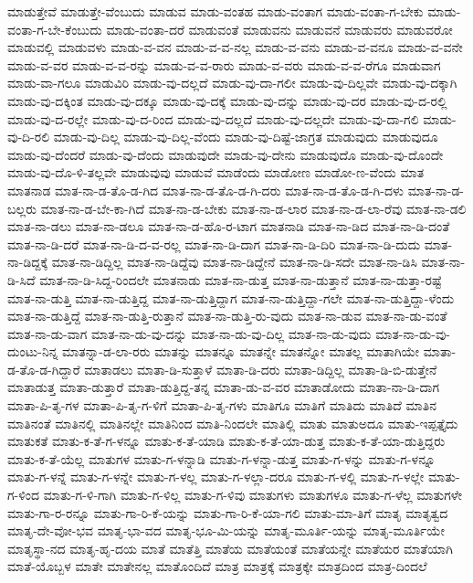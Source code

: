 {ಮಾಡುತ್ತೇವೆ
ಮಾಡುತ್ತೇ-ವೆಂಬುದು
ಮಾಡುವ
ಮಾಡು-ವಂತಹ
ಮಾಡು-ವಂತಾಗ
ಮಾಡು-ವಂತಾ-ಗ-ಬೇಕು
ಮಾಡು-ವಂತಾ-ಗ-ಬೇ-ಕೆಂಬುದು
ಮಾಡು-ವಂತಾ-ದರೆ
ಮಾಡುವಂತೆ
ಮಾಡುವನು
ಮಾಡುವನೆ
ಮಾಡುವರು
ಮಾಡುವರೋ
ಮಾಡುವಲ್ಲಿ
ಮಾಡುವಳು
ಮಾಡು-ವ-ವನ
ಮಾಡು-ವ-ವ-ನಲ್ಲ
ಮಾಡು-ವ-ವನು
ಮಾಡು-ವ-ವನೂ
ಮಾಡು-ವ-ವನೇ
ಮಾಡು-ವ-ವರ
ಮಾಡು-ವ-ವ-ರನ್ನು
ಮಾಡು-ವ-ವ-ರಾರು
ಮಾಡು-ವ-ವರು
ಮಾಡು-ವ-ವ-ರೆಗೂ
ಮಾಡುವಾಗ
ಮಾಡು-ವಾ-ಗಲೂ
ಮಾಡುವಿರಿ
ಮಾಡು-ವು-ದಲ್ಲದೆ
ಮಾಡು-ವು-ದಾ-ಗಲೀ
ಮಾಡು-ವು-ದಿಲ್ಲವೇ
ಮಾಡು-ವು-ದಕ್ಕಾಗಿ
ಮಾಡು-ವು-ದಕ್ಕಿಂತ
ಮಾಡು-ವು-ದಕ್ಕೂ
ಮಾಡು-ವು-ದಕ್ಕೆ
ಮಾಡು-ವು-ದನ್ನು
ಮಾಡು-ವು-ದರ
ಮಾಡು-ವು-ದ-ರಲ್ಲಿ
ಮಾಡು-ವು-ದ-ರಲ್ಲೇ
ಮಾಡು-ವು-ದ-ರಿಂದ
ಮಾಡು-ವು-ದಲ್ಲದೆ
ಮಾಡು-ವು-ದಲ್ಲದೇ
ಮಾಡು-ವು-ದಾ-ಗಲಿ
ಮಾಡು-ವು-ದಿ-ರಲಿ
ಮಾಡು-ವು-ದಿಲ್ಲ
ಮಾಡು-ವು-ದಿಲ್ಲ-ವೆಂದು
ಮಾಡು-ವು-ದಿಷ್ಟೆ-ಜಾಗ್ರತ
ಮಾಡುವುದು
ಮಾಡುವುದೂ
ಮಾಡು-ವು-ದೆಂದರೆ
ಮಾಡು-ವು-ದೆಂದು
ಮಾಡುವುದೇ
ಮಾಡು-ವು-ದೇನು
ಮಾಡುವುದೊ
ಮಾಡು-ವು-ದೊಂದೇ
ಮಾಡು-ವು-ದೊ-ಳಿ-ತಲ್ಲವೇ
ಮಾಡುವುವು
ಮಾಡುವೆ
ಮಾಡೆಂದು
ಮಾಡೋಣ
ಮಾಡೋ-ಣ-ವೆಂದು
ಮಾತ
ಮಾತನಾಡ
ಮಾತ-ನಾ-ಡ-ತೊ-ಡ-ಗಿದ
ಮಾತ-ನಾ-ಡ-ತೊ-ಡ-ಗಿ-ದರು
ಮಾತ-ನಾ-ಡ-ತೊ-ಡ-ಗಿ-ದಳು
ಮಾತ-ನಾ-ಡ-ಬಲ್ಲರು
ಮಾತ-ನಾ-ಡ-ಬೇ-ಕಾ-ಗಿದೆ
ಮಾತ-ನಾ-ಡ-ಬೇಕು
ಮಾತ-ನಾ-ಡ-ಲಾರ
ಮಾತ-ನಾ-ಡ-ಲಾ-ರೆವು
ಮಾತ-ನಾ-ಡಲಿ
ಮಾತ-ನಾ-ಡಲು
ಮಾತ-ನಾ-ಡಲೂ
ಮಾತ-ನಾ-ಡ-ಹೊ-ರ-ಟಾಗ
ಮಾತನಾಡಿ
ಮಾತ-ನಾ-ಡಿದ
ಮಾತ-ನಾ-ಡಿ-ದಂತೆ
ಮಾತ-ನಾ-ಡಿ-ದರೆ
ಮಾತ-ನಾ-ಡಿ-ದ-ವ-ರಲ್ಲ
ಮಾತ-ನಾ-ಡಿ-ದಾಗ
ಮಾತ-ನಾ-ಡಿ-ದಿರಿ
ಮಾತ-ನಾ-ಡಿ-ದುದು
ಮಾತ-ನಾ-ಡಿದ್ದಕ್ಕೆ
ಮಾತ-ನಾ-ಡಿದ್ದಿಲ್ಲ
ಮಾತ-ನಾ-ಡಿದ್ದೆವು
ಮಾತ-ನಾ-ಡಿದ್ದೇನೆ
ಮಾತ-ನಾ-ಡಿ-ಸದೇ
ಮಾತ-ನಾ-ಡಿಸಿ
ಮಾತ-ನಾ-ಡಿ-ಸಿದೆ
ಮಾತ-ನಾ-ಡಿ-ಸಿದ್ದ-ರಿಂದಲೇ
ಮಾತನಾಡು
ಮಾತ-ನಾ-ಡುತ್ತ
ಮಾತ-ನಾ-ಡುತ್ತಾನೆ
ಮಾತ-ನಾ-ಡುತ್ತಾ-ರಷ್ಟೆ
ಮಾತ-ನಾ-ಡುತ್ತಿ
ಮಾತ-ನಾ-ಡುತ್ತಿದ್ದ
ಮಾತ-ನಾ-ಡುತ್ತಿದ್ದಾಗ
ಮಾತ-ನಾ-ಡುತ್ತಿದ್ದಾ-ಗಲೇ
ಮಾತ-ನಾ-ಡುತ್ತಿದ್ದಾ-ಳೆಂದು
ಮಾತ-ನಾ-ಡುತ್ತಿದ್ದೆ
ಮಾತ-ನಾ-ಡುತ್ತಿ-ರುತ್ತಾನೆ
ಮಾತ-ನಾ-ಡುತ್ತಿ-ರು-ವುದು
ಮಾತ-ನಾ-ಡುವ
ಮಾತ-ನಾ-ಡು-ವಂತೆ
ಮಾತ-ನಾ-ಡು-ವಾಗ
ಮಾತ-ನಾ-ಡು-ವು-ದನ್ನು
ಮಾತ-ನಾ-ಡು-ವು-ದಿಲ್ಲ
ಮಾತ-ನಾ-ಡು-ವುದು
ಮಾತ-ನಾ-ಡು-ವು-ದುಂಟು-ನಿನ್ನ
ಮಾತನ್ನಾ-ಡ-ಲಾ-ರರು
ಮಾತನ್ನು
ಮಾತನ್ನೂ
ಮಾತನ್ನೇ
ಮಾತನ್ನೋ
ಮಾತಲ್ಲ
ಮಾತಾಗಿಯೇ
ಮಾತಾ-ಡ-ತೊ-ಡ-ಗಿದ್ದಾರೆ
ಮಾತಾಡಲು
ಮಾತಾ-ಡಿ-ಸುತ್ತಾಳೆ
ಮಾತಾ-ಡಿ-ದರು
ಮಾತಾ-ಡಿದ್ದಿಲ್ಲ
ಮಾತಾ-ಡಿ-ಬಿ-ಡುತ್ತೇನೆ
ಮಾತಾಡುತ್ತ
ಮಾತಾ-ಡುತ್ತಾರೆ
ಮಾತಾ-ಡುತ್ತಿದ್ದ-ತನ್ನ
ಮಾತಾ-ಡು-ವ-ವರ
ಮಾತಾಡೋದು
ಮಾತಾ-ನಾ-ಡಿ-ದಾಗ
ಮಾತಾ-ಪಿ-ತೃ-ಗಳ
ಮಾತಾ-ಪಿ-ತೃ-ಗ-ಳಿಗೆ
ಮಾತಾ-ಪಿ-ತೃ-ಗಳು
ಮಾತಿಗೂ
ಮಾತಿಗೆ
ಮಾತಿದು
ಮಾತಿದೆ
ಮಾತಿನ
ಮಾತಿನಂತೆ
ಮಾತಿನಲ್ಲಿ
ಮಾತಿನಲ್ಲೇ
ಮಾತಿನಿಂದ
ಮಾತಿ-ನಿಂದಲೇ
ಮಾತಿಲ್ಲಿ
ಮಾತು
ಮಾತುಅದೂ
ಮಾತು-ಇಪ್ಪತ್ತೈದು
ಮಾತುಕತೆ
ಮಾತು-ಕ-ತೆ-ಗ-ಳನ್ನೂ
ಮಾತು-ಕ-ತೆ-ಯಾಡಿ
ಮಾತು-ಕ-ತೆ-ಯಾ-ಡುತ್ತ
ಮಾತು-ಕ-ತೆ-ಯಾ-ಡುತ್ತಿದ್ದರು
ಮಾತು-ಕ-ತೆ-ಯೆಲ್ಲ
ಮಾತುಗಳ
ಮಾತು-ಗ-ಳನ್ನಾಡಿ
ಮಾತು-ಗ-ಳನ್ನಾ-ಡುತ್ತ
ಮಾತು-ಗ-ಳನ್ನು
ಮಾತು-ಗ-ಳನ್ನೂ
ಮಾತು-ಗ-ಳನ್ನೆ
ಮಾತು-ಗ-ಳನ್ನೇ
ಮಾತು-ಗ-ಳಲ್ಲ
ಮಾತು-ಗ-ಳಲ್ಲಾ-ದರೂ
ಮಾತು-ಗ-ಳಲ್ಲಿ
ಮಾತು-ಗ-ಳಲ್ಲೇ
ಮಾತು-ಗ-ಳಿಂದ
ಮಾತು-ಗ-ಳಿ-ಗಾಗಿ
ಮಾತು-ಗ-ಳಿಲ್ಲ
ಮಾತು-ಗ-ಳಿವು
ಮಾತುಗಳು
ಮಾತುಗಳೂ
ಮಾತು-ಗ-ಳೆಲ್ಲ
ಮಾತುಗಳೇ
ಮಾತು-ಗಾ-ರ-ರನ್ನೂ
ಮಾತು-ಗಾ-ರಿ-ಕೆ-ಯನ್ನು
ಮಾತು-ಗಾ-ರಿ-ಕೆ-ಯಾ-ಗಲಿ
ಮಾತು-ಮಾ-ತಿಗೆ
ಮಾತೃ
ಮಾತೃತ್ವದ
ಮಾತೃ-ದೇ-ವೋ-ಭವ
ಮಾತೃ-ಭಾ-ವದ
ಮಾತೃ-ಭೂ-ಮಿ-ಯನ್ನು
ಮಾತೃ-ಮೂರ್ತಿ-ಯನ್ನು
ಮಾತೃ-ಮೂರ್ತಿಯೇ
ಮಾತೃಸ್ಥಾ-ನದ
ಮಾತೃ-ಹೃ-ದಯ
ಮಾತೆ
ಮಾತೆತ್ತಿ
ಮಾತೆಯ
ಮಾತೆಯಂತೆ
ಮಾತೆಯನ್ನೇ
ಮಾತೆಯರ
ಮಾತೆಯಾಗಿ
ಮಾತೆ-ಯೊಬ್ಬಳ
ಮಾತೇ
ಮಾತೇನಲ್ಲ
ಮಾತೊಂದಿದೆ
ಮಾತ್ರ
ಮಾತ್ರಕ್ಕೆ
ಮಾತ್ರಕ್ಕೇ
ಮಾತ್ರದಿಂದ
ಮಾತ್ರ-ದಿಂದಲೆ
}
